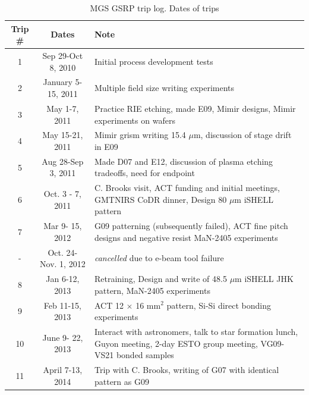 \documentclass[]{spie}  %
\begin{document}
\begin{table}
	\caption{MGS GSRP trip log.  Dates of trips }
	\begin{tabular}{ccp{8cm}}
	\hline
	 Trip \# &Dates & Note\\
	\hline
	1 & Sep 29-Oct 8, 2010 & Initial process development tests \\
	2 & January 5-15, 2011 & Multiple field size writing experiments\\
	3 & May 1-7, 2011 & Practice RIE etching, made E09, Mimir designs, Mimir experiments on wafers\\	
	4 & May 15-21, 2011 & Mimir grism writing 15.4 $\mu$m, discussion of stage drift in E09  \\	
	5 & Aug 28-Sep 3, 2011 & Made D07 and E12, discussion of plasma etching tradeoffs, need for endpoint\\		
	6 & Oct. 3 - 7, 2011 & C. Brooks visit, ACT funding and initial meetings, GMTNIRS CoDR dinner, Design 80 $\mu$m iSHELL pattern\\
	7 & Mar 9- 15, 2012 & G09 patterning (subsequently failed), ACT fine pitch designs and negative resist MaN-2405 experiments\\
	-  & Oct. 24- Nov. 1, 2012 & \emph{cancelled} due to e-beam tool failure \\
	8 & Jan 6-12, 2013 & Retraining, Design and write of 48.5 $\mu$m iSHELL JHK pattern, MaN-2405 experiments\\
	9 & Feb 11-15, 2013 & ACT 12 $\times$ 16 mm$^2$ pattern, Si-Si direct bonding experiments\\
	10 & June 9- 22, 2013 & Interact with astronomers, talk to star formation lunch, Guyon meeting, 2-day ESTO group meeting, VG09-VS21 bonded samples\\
	11 & April 7-13, 2014 & Trip with C. Brooks, writing of G07 with identical pattern as G09\\
	\hline
	\end{tabular}
\end{table}
\end{document}
